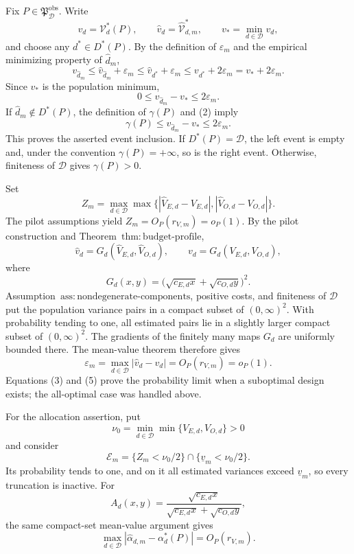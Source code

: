Fix \(P\in\mathfrak P_{\mathcal D}^{\mathrm{obs}}\). Write
\[
 v_d=\mathcal V_d^*(P),\qquad
 \widehat v_d=\widehat{\mathcal V}_{d,m}^*,
 \qquad v_*=\min_{d\in\mathcal D}v_d,
\]
and choose any \(d^*\in D^*(P)\).  By the definition of \(\varepsilon_m\) and the empirical minimizing property of \(\widehat d_m\),
\[
 v_{\widehat d_m}
 \le \widehat v_{\widehat d_m}+\varepsilon_m
 \le \widehat v_{d^*}+\varepsilon_m
 \le v_{d^*}+2\varepsilon_m
 =v_*+2\varepsilon_m.                                             \tag{1}
\]
Since \(v_*\) is the population minimum,
\[
 0\le v_{\widehat d_m}-v_*\le2\varepsilon_m.                     \tag{2}
\]
If \(\widehat d_m\notin D^*(P)\), the definition of \(\gamma(P)\) and (2) imply
\[
 \gamma(P)\le v_{\widehat d_m}-v_*\le2\varepsilon_m.             \tag{3}
\]
This proves the asserted event inclusion.  If \(D^*(P)=\mathcal D\), the left event is empty and, under the convention \(\gamma(P)=+\infty\), so is the right event.  Otherwise, finiteness of \(\mathcal D\) gives \(\gamma(P)>0\).

Set
\[
 Z_m=\max_{d\in\mathcal D}\max\bigl\{
 |\widehat V_{E,d}-V_{E,d}|,
 |\widehat V_{O,d}-V_{O,d}|\bigr\}.
\]
The pilot assumptions yield \(Z_m=O_P(r_{V,m})=o_P(1)\).  By the pilot construction and Theorem~\(\mathrm{thm{:}budget\text{-}profile}\),
\[
 \widehat v_d=G_d(\widehat V_{E,d},\widehat V_{O,d}),
 \qquad
 v_d=G_d(V_{E,d},V_{O,d}),                                        \tag{4}
\]
where
\[
 G_d(x,y)=\bigl(\sqrt{c_{E,d}x}+\sqrt{c_{O,d}y}\bigr)^2.
\]
Assumption~\(\mathrm{ass{:}nondegenerate\text{-}components}\), positive costs, and finiteness of \(\mathcal D\) put the population variance pairs in a compact subset of \((0,\infty)^2\).  With probability tending to one, all estimated pairs lie in a slightly larger compact subset of \((0,\infty)^2\).  The gradients of the finitely many maps \(G_d\) are uniformly bounded there.  The mean-value theorem therefore gives
\[
 \varepsilon_m
 =\max_{d\in\mathcal D}|\widehat v_d-v_d|
 =O_P(r_{V,m})=o_P(1).                                             \tag{5}
\]
Equations (3) and (5) prove the probability limit when a suboptimal design exists; the all-optimal case was handled above.

For the allocation assertion, put
\[
 \nu_0=\min_{d\in\mathcal D}\min\{V_{E,d},V_{O,d}\}>0
\]
and consider
\[
 \mathcal E_m
 =\{Z_m<\nu_0/2\}\cap\{\underline v_m<\nu_0/2\}.             \tag{6}
\]
Its probability tends to one, and on it all estimated variances exceed \(\underline v_m\), so every truncation is inactive.  For
\[
 A_d(x,y)=
 \frac{\sqrt{c_{E,d}x}}
 {\sqrt{c_{E,d}x}+\sqrt{c_{O,d}y}},
\]
the same compact-set mean-value argument gives
\[
 \max_{d\in\mathcal D}
 |\widehat\alpha_{d,m}-\alpha_d^*(P)|=O_P(r_{V,m}).                \tag{7}
\]

